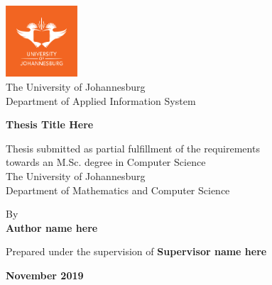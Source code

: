 \begin{titlepage}
    \begin{center}
        \vspace*{1cm}
        
        \includegraphics[width=0.2\textwidth]{uj.logo.png}\\
        The University of Johannesburg\\
        Department of Applied Information System
        
        \vspace{2cm}
        

        {\Large \textbf{Thesis Title Here}}
        \vspace{1.5cm}
        
        Thesis submitted as partial fulfillment of the requirements\\towards an M.Sc. degree in Computer Science\\
        The University of Johannesburg\\
        Department of Mathematics and Computer Science
        
        \vspace{1cm}
        
        By \\
        \textbf{Author name here}
        
        \vspace{1cm}
        
        Prepared under the supervision of \textbf{Supervisor name here}
        
        \vfill
        
        \textbf{November 2019}
    \end{center}
\end{titlepage}